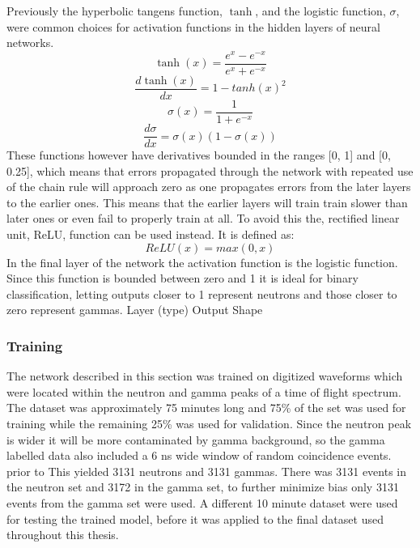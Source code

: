 \documentclass[main.tex]{subfiles}
\begin{document}
Previously the hyperbolic tangens function, $\tanh$, and the logistic function, $\sigma$, were common choices for activation functions in the hidden layers of neural networks.
\begin{equation}
\tanh(x) = \frac{e^x - e^{-x}}{e^x + e^{-x}}
\end{equation}
\begin{equation}
\frac{d\tanh(x)}{dx}= 1 -tanh(x)^2
\end{equation}
\begin{equation}
	\sigma(x) = \frac{1}{1+e^{-x}}
\end{equation}
\begin{equation}
\frac{d\sigma}{dx} = \sigma(x)(1-\sigma(x))
\end{equation}
These functions however have derivatives bounded in the ranges [0, 1] and [0, 0.25], which means that errors propagated through the network with repeated use of the chain rule will approach zero as one propagates errors from the later layers to the earlier ones. This means that the earlier layers will train train slower than later ones or even fail to properly train at all. To avoid this the, rectified linear unit, ReLU, function can be used instead. It is defined as:
\begin{equation}
	ReLU(x) = max(0,x)
\end{equation}
In the final layer of the network the activation function is the logistic function. Since this function is bounded between zero and 1 it is ideal for binary classification, letting outputs closer to 1 represent neutrons and those closer to zero represent gammas.
Layer (type)                 Output Shape              

\subsubsection{Training}
The network described in this section was trained on digitized waveforms which were located within the neutron and gamma peaks of a time of flight spectrum. The dataset was approximately 75 minutes long and 75\% of the set was used for training while the remaining 25\% was used for validation. Since the neutron peak is wider it will be more contaminated by gamma background, so the gamma labelled data also included a 6 ns wide window of random coincidence events. prior to This yielded 3131 neutrons and 3131 gammas. There was 3131 events in the neutron set and 3172 in the gamma set, to further minimize bias only 3131 events from the gamma set were used. A different 10 minute dataset were used for testing the trained model, before it was applied to the final dataset used throughout this thesis.
\end{document}
